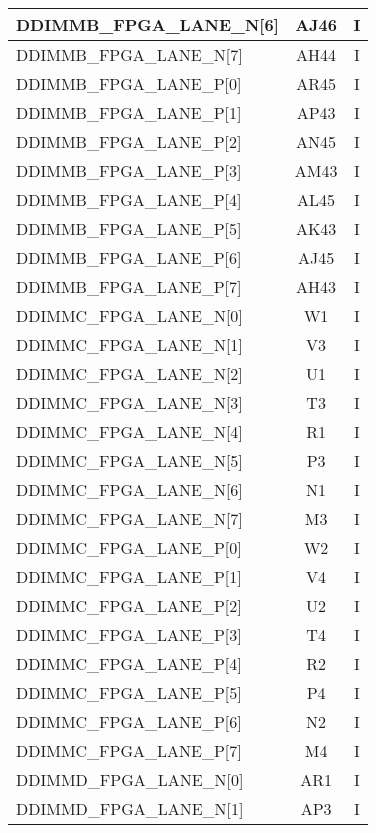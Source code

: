 \begin{longtable}[l]{| l | c | c |}
  DDIMMB\_FPGA\_LANE\_N[6]     & AJ46 & I   \\ \hline
  DDIMMB\_FPGA\_LANE\_N[7]     & AH44 & I   \\ \hline
  DDIMMB\_FPGA\_LANE\_P[0]     & AR45 & I   \\ \hline
  DDIMMB\_FPGA\_LANE\_P[1]     & AP43 & I   \\ \hline
  DDIMMB\_FPGA\_LANE\_P[2]     & AN45 & I   \\ \hline
  DDIMMB\_FPGA\_LANE\_P[3]     & AM43 & I   \\ \hline
  DDIMMB\_FPGA\_LANE\_P[4]     & AL45 & I   \\ \hline
  DDIMMB\_FPGA\_LANE\_P[5]     & AK43 & I   \\ \hline
  DDIMMB\_FPGA\_LANE\_P[6]     & AJ45 & I   \\ \hline
  DDIMMB\_FPGA\_LANE\_P[7]     & AH43 & I   \\ \hline
  DDIMMC\_FPGA\_LANE\_N[0]     & W1   & I   \\ \hline
  DDIMMC\_FPGA\_LANE\_N[1]     & V3   & I   \\ \hline
  DDIMMC\_FPGA\_LANE\_N[2]     & U1   & I   \\ \hline
  DDIMMC\_FPGA\_LANE\_N[3]     & T3   & I   \\ \hline
  DDIMMC\_FPGA\_LANE\_N[4]     & R1   & I   \\ \hline
  DDIMMC\_FPGA\_LANE\_N[5]     & P3   & I   \\ \hline
  DDIMMC\_FPGA\_LANE\_N[6]     & N1   & I   \\ \hline
  DDIMMC\_FPGA\_LANE\_N[7]     & M3   & I   \\ \hline
  DDIMMC\_FPGA\_LANE\_P[0]     & W2   & I   \\ \hline
  DDIMMC\_FPGA\_LANE\_P[1]     & V4   & I   \\ \hline
  DDIMMC\_FPGA\_LANE\_P[2]     & U2   & I   \\ \hline
  DDIMMC\_FPGA\_LANE\_P[3]     & T4   & I   \\ \hline
  DDIMMC\_FPGA\_LANE\_P[4]     & R2   & I   \\ \hline
  DDIMMC\_FPGA\_LANE\_P[5]     & P4   & I   \\ \hline
  DDIMMC\_FPGA\_LANE\_P[6]     & N2   & I   \\ \hline
  DDIMMC\_FPGA\_LANE\_P[7]     & M4   & I   \\ \hline
  DDIMMD\_FPGA\_LANE\_N[0]     & AR1  & I   \\ \hline
  DDIMMD\_FPGA\_LANE\_N[1]     & AP3  & I   \\ \hline

\end{longtable}
